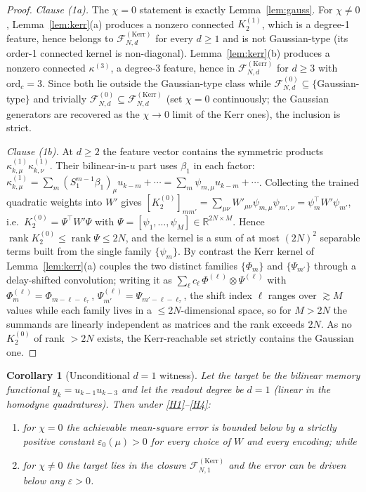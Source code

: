 \documentclass[11pt]{article}
\newtheorem{corollary}{Corollary}
\theoremstyle{remark}
\newcommand{\Fclass}[2]{\mathcal{F}^{(#1)}_{#2}}
\newcommand{\Kerr}{\mathrm{Kerr}}
\newcommand{\ordc}{\mathrm{ord}_c}
\begin{document}
\begin{proof}
\emph{Clause (1a).} The $\chi=0$ statement is exactly Lemma~\ref{lem:gauss}. For
$\chi\neq0$, Lemma~\ref{lem:kerr}(a) produces a nonzero connected $K^{(1)}_2$,
which is a degree-1 feature, hence belongs to $\Fclass{\Kerr}{N,d}$ for every
$d\ge1$ and is not Gaussian-type (its order-1 connected kernel is non-diagonal).
Lemma~\ref{lem:kerr}(b) produces a nonzero connected $\kappa^{(3)}$, a degree-3
feature, hence in $\Fclass{\Kerr}{N,d}$ for $d\ge3$ with $\ordc=3$. Since both lie
outside the Gaussian-type class while $\Fclass{0}{N,d}\subseteq\{$Gaussian-type$\}$
and trivially $\Fclass{0}{N,d}\subseteq\Fclass{\Kerr}{N,d}$ (set $\chi=0$
continuously; the Gaussian generators are recovered as the $\chi\to0$ limit of the
Kerr ones), the inclusion is strict.

\emph{Clause (1b).} At $d\ge2$ the feature vector contains the symmetric products
$\kappa^{(1)}_{k,\mu}\kappa^{(1)}_{k,\nu}$. Their bilinear-in-$u$ part uses
$\beta_1$ in each factor:
$\kappa^{(1)}_{k,\mu}=\sum_m(S_1^{m-1}\beta_1)_\mu u_{k-m}+\cdots
=\sum_m\psi_{m,\mu}u_{k-m}+\cdots$. Collecting the trained quadratic weights into
$W'$ gives $[K^{(0)}_2]_{mm'}=\sum_{\mu\nu}W'_{\mu\nu}\psi_{m,\mu}\psi_{m',\nu}
=\psi_m^\top W'\psi_{m'}$, i.e.\ $K^{(0)}_2=\Psi^\top W'\Psi$ with
$\Psi=[\psi_1,\dots,\psi_M]\in\mathbb{R}^{2N\times M}$. Hence
$\operatorname{rank}K^{(0)}_2\le\operatorname{rank}\Psi\le2N$, and the kernel is a
sum of at most $(2N)^2$ separable terms built from the single family
$\{\psi_m\}$. By contrast the Kerr kernel of Lemma~\ref{lem:kerr}(a) couples the
two distinct families $\{\Phi_m\}$ and $\{\Psi_{m'}\}$ through a delay-shifted
convolution; writing it as $\sum_\ell c_\ell\,\Phi^{(\ell)}\otimes\Psi^{(\ell)}$
with $\Phi^{(\ell)}_m=\Phi_{m-\ell-\ell_\tau}$,
$\Psi^{(\ell)}_{m'}=\Psi_{m'-\ell-\ell_\tau}$, the shift index $\ell$ ranges over
$\gtrsim M$ values while each family lives in a $\le2N$-dimensional space, so for
$M>2N$ the summands are linearly independent as matrices and the rank exceeds
$2N$. As no $K^{(0)}_2$ of rank $>2N$ exists, the Kerr-reachable set strictly
contains the Gaussian one.
\end{proof}

\begin{corollary}[Unconditional $d=1$ witness]\label{cor:witness}
Let the target be the bilinear memory functional $y_k=u_{k-1}u_{k-3}$ and let the
readout degree be $d=1$ (linear in the homodyne quadratures). Then under
\ref{H1}--\ref{H4}:
\begin{enumerate}[label=(\roman*)]
\item for $\chi=0$ the achievable mean-square error is bounded below by a
strictly positive constant $\varepsilon_0(\mu)>0$ for every choice of $W$ and
every encoding; while
\item for $\chi\neq0$ the target lies in the closure $\Fclass{\Kerr}{N,1}$ and the
error can be driven below any $\varepsilon>0$.
\end{enumerate}
\end{corollary}
\end{document}
